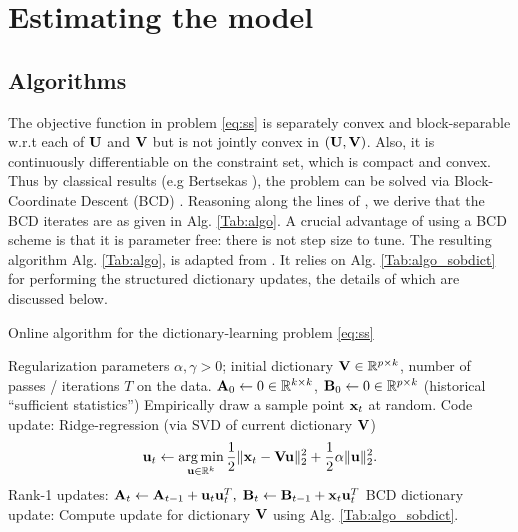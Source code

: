 \section{Estimating the model}
\subsection{Algorithms}
The objective function in problem
\eqref{eq:ss} is separately convex and block-separable
w.r.t each of $\mathbf{U}$ and $\mathbf{V}$ but is not jointly convex in $(\mathbf{U},\mathbf{V})$. Also,
it is continuously differentiable on the constraint set, which is
compact and convex. Thus by classical results (e.g Bertsekas  \cite{bertsekas1999nonlinear}), the problem can be solved via
Block-Coordinate Descent
(BCD)  \cite{mairal2010}.
 Reasoning along the lines of  \cite{jenatton2010structured}, we derive
 that the BCD iterates are as given in Alg. \ref{Tab:algo}.
A crucial advantage of using a BCD scheme is that it is parameter
free: there is not step size to tune.
The resulting algorithm Alg. \ref{Tab:algo}, is adapted from  \cite{mairal2010}.
It relies on Alg. \ref{Tab:algo_sobdict} for performing the structured dictionary updates, the details of which are discussed below.

\begin{algorithm}
\caption{Online algorithm for the dictionary-learning problem
  \eqref{eq:ss}}
\label{Tab:algo}
\begin{algorithmic}[1]
\REQUIRE %
Regularization parameters $\alpha, \gamma > 0$;
initial dictionary $\mathbf{V} \in \mathbb R^{p \times k}$,
number of passes / iterations $T$ on the data.
\STATE $\mathbf{A}_0 \leftarrow 0 \in \mathbb R^{k \times k}$, $\mathbf{B}_0
\leftarrow 0 \in \mathbb R^{p \times k}$ \text (historical ``sufficient statistics'')
\STATE Empirically draw a sample point $\mathbf{x}_t$ at random.
\STATE Code update: Ridge-regression (via SVD of current dictionary $\mathbf{V}$)
\begin{equation}
\mathbf{u}_t \leftarrow \operatorname*{arg\,min}_{\mathbf{u} \in \mathbb R^k}\frac{1}{2}\|\mathbf{x}_t -
\mathbf{V} \mathbf{u}\|_2^2 + \frac{1}{2}\alpha\|\mathbf{u}\|_2^2.
\label{eq:coding}
\end{equation}
\STATE Rank-1 updates:
$\mathbf{A}_t \leftarrow \mathbf{A}_{t-1} + \mathbf{u}_t\mathbf{u}_t^T,\; \mathbf{B}_t \leftarrow \mathbf{B}_{t-1} + \mathbf{x}_t\mathbf{u}_t^T$
\STATE BCD dictionary update: Compute update for dictionary $\mathbf{V}$ using
Alg. \ref{Tab:algo_sobdict}.
\ENDFOR
\end{algorithmic}
\end{algorithm}

